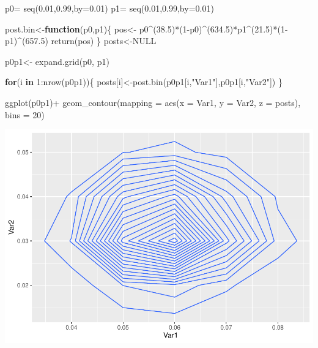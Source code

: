 \documentclass[
]{book}
\newenvironment{Shaded}{\begin{snugshade}}{\end{snugshade}}
\newcommand{\AttributeTok}[1]{\textcolor[rgb]{0.77,0.63,0.00}{#1}}
\newcommand{\ConstantTok}[1]{\textcolor[rgb]{0.00,0.00,0.00}{#1}}
\newcommand{\ControlFlowTok}[1]{\textcolor[rgb]{0.13,0.29,0.53}{\textbf{#1}}}
\newcommand{\DecValTok}[1]{\textcolor[rgb]{0.00,0.00,0.81}{#1}}
\newcommand{\FloatTok}[1]{\textcolor[rgb]{0.00,0.00,0.81}{#1}}
\newcommand{\FunctionTok}[1]{\textcolor[rgb]{0.00,0.00,0.00}{#1}}
\newcommand{\NormalTok}[1]{#1}
\newcommand{\OtherTok}[1]{\textcolor[rgb]{0.56,0.35,0.01}{#1}}
\newcommand{\SpecialCharTok}[1]{\textcolor[rgb]{0.00,0.00,0.00}{#1}}
\newcommand{\StringTok}[1]{\textcolor[rgb]{0.31,0.60,0.02}{#1}}
\theoremstyle{definition}
\theoremstyle{definition}
\theoremstyle{definition}
\theoremstyle{definition}
\theoremstyle{remark}
\begin{document}
\begin{Shaded}
\begin{Highlighting}[]
\NormalTok{p0}\OtherTok{=} \FunctionTok{seq}\NormalTok{(}\FloatTok{0.01}\NormalTok{,}\FloatTok{0.99}\NormalTok{,}\AttributeTok{by=}\FloatTok{0.01}\NormalTok{)}
\NormalTok{p1}\OtherTok{=} \FunctionTok{seq}\NormalTok{(}\FloatTok{0.01}\NormalTok{,}\FloatTok{0.99}\NormalTok{,}\AttributeTok{by=}\FloatTok{0.01}\NormalTok{)}

\NormalTok{post.bin}\OtherTok{\textless{}{-}}\ControlFlowTok{function}\NormalTok{(p0,p1)\{}
\NormalTok{  pos}\OtherTok{\textless{}{-}}\NormalTok{ p0}\SpecialCharTok{\^{}}\NormalTok{(}\FloatTok{38.5}\NormalTok{)}\SpecialCharTok{*}\NormalTok{(}\DecValTok{1}\SpecialCharTok{{-}}\NormalTok{p0)}\SpecialCharTok{\^{}}\NormalTok{(}\FloatTok{634.5}\NormalTok{)}\SpecialCharTok{*}\NormalTok{p1}\SpecialCharTok{\^{}}\NormalTok{(}\FloatTok{21.5}\NormalTok{)}\SpecialCharTok{*}\NormalTok{(}\DecValTok{1}\SpecialCharTok{{-}}\NormalTok{p1)}\SpecialCharTok{\^{}}\NormalTok{(}\FloatTok{657.5}\NormalTok{)}
  \FunctionTok{return}\NormalTok{(pos)}
\NormalTok{\}}
\NormalTok{ posts}\OtherTok{\textless{}{-}}\ConstantTok{NULL}
 
\NormalTok{p0p1}\OtherTok{\textless{}{-}} \FunctionTok{expand.grid}\NormalTok{(p0, p1)}

\ControlFlowTok{for}\NormalTok{(i }\ControlFlowTok{in} \DecValTok{1}\SpecialCharTok{:}\FunctionTok{nrow}\NormalTok{(p0p1))\{}
\NormalTok{  posts[i]}\OtherTok{\textless{}{-}}\FunctionTok{post.bin}\NormalTok{(p0p1[i,}\StringTok{"Var1"}\NormalTok{],p0p1[i,}\StringTok{"Var2"}\NormalTok{]) }
\NormalTok{\}}

 \FunctionTok{ggplot}\NormalTok{(p0p1)}\SpecialCharTok{+}
 \FunctionTok{geom\_contour}\NormalTok{(}\AttributeTok{mapping =} \FunctionTok{aes}\NormalTok{(}\AttributeTok{x =}\NormalTok{ Var1, }\AttributeTok{y =}\NormalTok{ Var2, }\AttributeTok{z =}\NormalTok{ posts), }\AttributeTok{bins =} \DecValTok{20}\NormalTok{)}
\end{Highlighting}
\end{Shaded}

\includegraphics{_main_files/figure-latex/unnamed-chunk-33-1.pdf}
\end{document}

